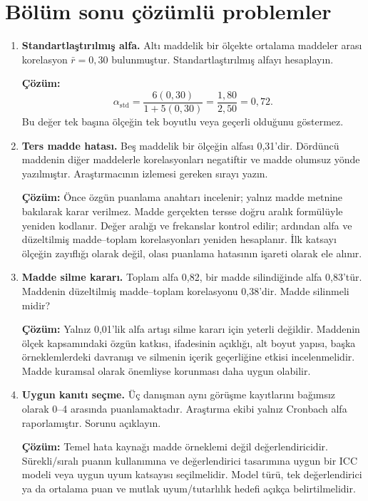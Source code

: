 \section{Bölüm sonu çözümlü problemler}

\begin{enumerate}
  \item \textbf{Standartlaştırılmış alfa.} Altı maddelik bir ölçekte ortalama
  maddeler arası korelasyon $\bar r=0{,}30$ bulunmuştur. Standartlaştırılmış
  alfayı hesaplayın.

  \textbf{Çözüm:}
  \[
  \alpha_{\mathrm{std}}
  =\frac{6(0{,}30)}{1+5(0{,}30)}
  =\frac{1{,}80}{2{,}50}=0{,}72.
  \]
  Bu değer tek başına ölçeğin tek boyutlu veya geçerli olduğunu göstermez.

  \item \textbf{Ters madde hatası.} Beş maddelik bir ölçeğin alfası 0,31'dir.
  Dördüncü maddenin diğer maddelerle korelasyonları negatiftir ve madde
  olumsuz yönde yazılmıştır. Araştırmacının izlemesi gereken sırayı yazın.

  \textbf{Çözüm:} Önce özgün puanlama anahtarı incelenir; yalnız madde metnine
  bakılarak karar verilmez. Madde gerçekten tersse doğru aralık formülüyle
  yeniden kodlanır. Değer aralığı ve frekanslar kontrol edilir; ardından alfa
  ve düzeltilmiş madde--toplam korelasyonları yeniden hesaplanır. İlk katsayı
  ölçeğin zayıflığı olarak değil, olası puanlama hatasının işareti olarak ele
  alınır.

  \item \textbf{Madde silme kararı.} Toplam alfa 0,82, bir madde silindiğinde
  alfa 0,83'tür. Maddenin düzeltilmiş madde--toplam korelasyonu 0,38'dir.
  Madde silinmeli midir?

  \textbf{Çözüm:} Yalnız 0,01'lik alfa artışı silme kararı için yeterli
  değildir. Maddenin ölçek kapsamındaki özgün katkısı, ifadesinin açıklığı,
  alt boyut yapısı, başka örneklemlerdeki davranışı ve silmenin içerik
  geçerliğine etkisi incelenmelidir. Madde kuramsal olarak önemliyse korunması
  daha uygun olabilir.

  \item \textbf{Uygun kanıtı seçme.} Üç danışman aynı görüşme kayıtlarını
  bağımsız olarak 0--4 arasında puanlamaktadır. Araştırma ekibi yalnız
  Cronbach alfa raporlamıştır. Sorunu açıklayın.

  \textbf{Çözüm:} Temel hata kaynağı madde örneklemi değil değerlendiricidir.
  Sürekli/sıralı puanın kullanımına ve değerlendirici tasarımına uygun bir ICC
  modeli veya uygun uyum katsayısı seçilmelidir. Model türü, tek değerlendirici
  ya da ortalama puan ve mutlak uyum/tutarlılık hedefi açıkça belirtilmelidir.
\end{enumerate}
